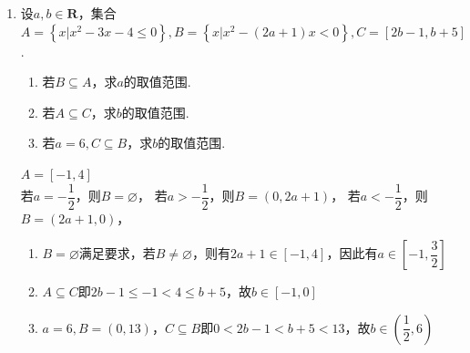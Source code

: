 \begin{enumerate}
\begin{enumerate}
        \item 设$a, b \in \mathbf{R}$，集合$A = \left\{x | x^2 - 3x - 4 \leq 0\right\}, B = \left\{x | x^2 - (2a+1)x < 0\right\}, C = [2b-1, b+5]$.
        \begin{enumerate}
            \item 若$B \subseteq A$，求$a$的取值范围.
            \item 若$A \subseteq C$，求$b$的取值范围.
            \item 若$a = 6, C \subseteq B$，求$b$的取值范围.
        \end{enumerate}
        \begin{jieda}
            $A = [-1, 4]$ \\
            若$a = -\dfrac{1}{2}$，则$B = \varnothing$，
            若$a > -\dfrac{1}{2}$，则$B = (0, 2a+1)$，
            若$a < -\dfrac{1}{2}$，则$B = (2a+1, 0)$，
            \begin{enumerate}
                \item $B = \varnothing$满足要求，若$B \neq \varnothing$，则有$2a+1 \in [-1, 4]$，因此有$a \in \left[-1, \dfrac{3}{2}\right]$
                \item $A \subseteq C$即$2b-1 \leq -1 < 4 \leq b+5$，故$b \in [-1, 0]$
                \item $a = 6, B = (0, 13)$，$C \subseteq B$即$0 < 2b-1 < b + 5 < 13$，故$b \in \left(\dfrac{1}{2}, 6\right)$
            \end{enumerate}
        \end{jieda}
    \end{enumerate}
    

\end{enumerate}

